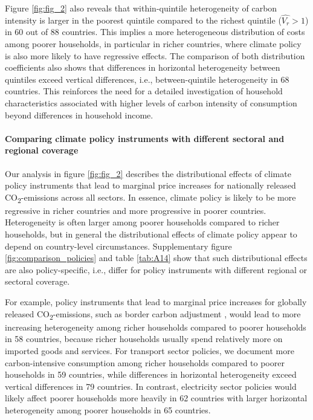 \documentclass[12pt, a4paper]{article}
\begin{document}
Figure \ref{fig:fig_2} also reveals that within-quintile heterogeneity of carbon intensity is larger in the poorest quintile compared to the richest quintile ($\widehat{V_{r}}>1$) in 60 out of 88 countries. This implies a more heterogeneous distribution of costs among poorer households, in particular in richer countries, where climate policy is also more likely to have regressive effects. The comparison of both distribution coefficients also shows that differences in horizontal heterogeneity between quintiles exceed vertical differences, i.e., between-quintile heterogeneity in 68 countries. This reinforces the need for a detailed investigation of household characteristics associated with higher levels of carbon intensity of consumption beyond differences in household income.

\paragraph{Comparing climate policy instruments with different sectoral and regional coverage}

Our analysis in figure \ref{fig:fig_2} describes the distributional effects of climate policy instruments that lead to marginal price increases for nationally released CO\textsubscript{2}-emissions across all sectors. In essence, climate policy is likely to be more regressive in richer countries and more progressive in poorer countries. Heterogeneity is often larger among poorer households compared to richer households, but in general the distributional effects of climate policy appear to depend on country-level circumstances. Supplementary figure \ref{fig:comparison_policies} and table \ref{tab:A14} show that such distributional effects are also policy-specific, i.e., differ for policy instruments with different regional or sectoral coverage.

For example, policy instruments that lead to marginal price increases for globally released CO\textsubscript{2}-emissions, such as border carbon adjustment \autocite[e.g.,][]{Mehling.2019,Cosbey.2019}, would lead to more increasing heterogeneity among richer households compared to poorer households in 58 countries, because richer households usually spend relatively more on imported goods and services. For transport sector policies, we document more carbon-intensive consumption among richer households compared to poorer households in 59 countries, while differences in horizontal heterogeneity exceed vertical differences in 79 countries. In contrast, electricity sector policies would likely affect poorer households more heavily in 62 countries with larger horizontal heterogeneity among poorer households in 65 countries. 
\end{document}
